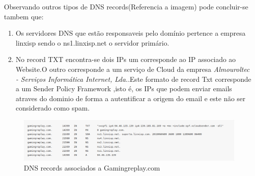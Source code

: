 Observando outros tipos de DNS records(Referencia a imagem) pode concluir-se tambem que:

\begin{enumerate}

\item Os servidores DNS que estão responsaveis pelo domínio pertence a empresa linxisp sendo o ns1.linxisp.net o servidor primário.

\item No record TXT encontra-se dois IPs um corresponde ao IP associado ao Website.O outro corresponde a um serviço de Cloud da empresa \emph{Almouroltec - Serviços Informática Internet, Lda.}.Este formato de record Txt corresponde a um Sender Policy Framework ,isto é, os IPs que podem enviar emails atraves do dominio de forma a autentificar a origem do email e este não ser considerado como spam.

\end{enumerate}

\begin{figure}[h!]
\caption{DNS records associados a Gamingreplay.com}
\includegraphics{Images/DNSRecords.png}
\end{figure}




